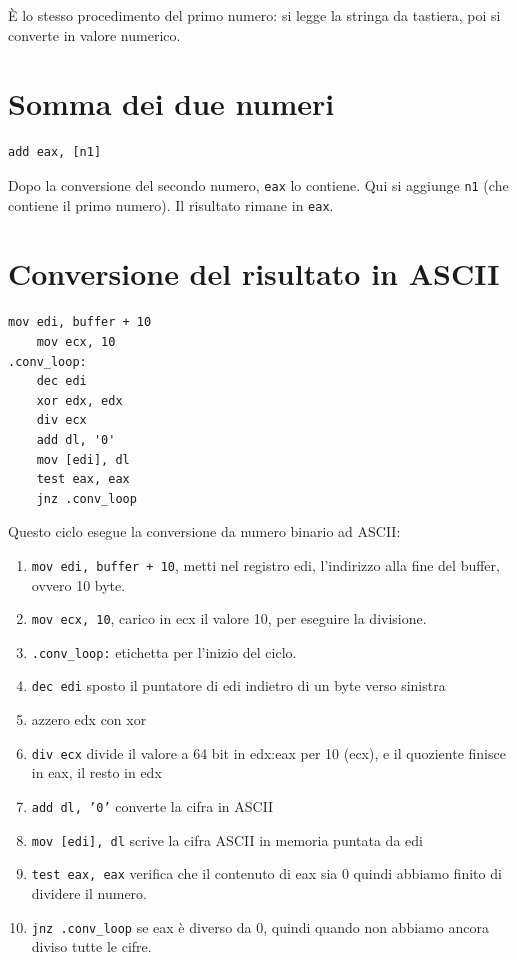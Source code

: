 \documentclass[a4paper,12pt]{article}
\begin{document}
	È lo stesso procedimento del primo numero:  
	si legge la stringa da tastiera, poi si converte in valore numerico.
	
	\section*{Somma dei due numeri}
	\begin{lstlisting}[language={[x86masm]Assembler}]
add eax, [n1]
	\end{lstlisting}
	
	Dopo la conversione del secondo numero, \texttt{eax} lo contiene.  
	Qui si aggiunge \texttt{n1} (che contiene il primo numero).  
	Il risultato rimane in \texttt{eax}.
	
	\newpage
	
	\section*{Conversione del risultato in ASCII}
	\begin{lstlisting}[language={[x86masm]Assembler}]
	mov edi, buffer + 10
	mov ecx, 10
.conv_loop:
	dec edi
	xor edx, edx
	div ecx
	add dl, '0'
	mov [edi], dl
	test eax, eax
	jnz .conv_loop
	\end{lstlisting}
	
	Questo ciclo esegue la conversione da numero binario ad ASCII:
	\begin{enumerate}
		\item \texttt{mov edi,  buffer + 10}, metti nel registro edi, l'indirizzo alla fine del buffer, ovvero 10 byte.
		\item \texttt{mov ecx, 10}, carico in ecx il valore 10, per eseguire la divisione.
		\item \texttt{.conv\_loop:} etichetta per l'inizio del ciclo.
		\item \texttt{dec edi} sposto il puntatore di edi indietro di un byte verso sinistra
		\item azzero edx con xor
		\item \texttt{div ecx} divide il valore a 64 bit in edx:eax per 10 (ecx), e il quoziente finisce in eax, il resto in edx
		\item \texttt{add dl, '0'} converte la cifra in ASCII
		\item \texttt{mov [edi], dl} scrive la cifra ASCII in memoria puntata da edi
		\item \texttt{test eax, eax} verifica che il contenuto di eax sia 0 quindi abbiamo finito di dividere il numero.
		\item \texttt{jnz .conv\_loop} se eax è diverso da 0, quindi quando non abbiamo ancora diviso tutte le cifre.
	\end{enumerate}
	
\end{document}
